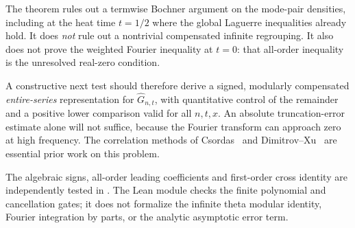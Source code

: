 The theorem rules out a termwise Bochner
argument on the mode-pair densities, including
at the heat time \(t=1/2\) where the global
Laguerre inequalities already hold. It does
\emph{not} rule out a nontrivial compensated
infinite regrouping. It also does not prove
the weighted Fourier inequality at \(t=0\):
that all-order inequality is the unresolved
real-zero condition.

A constructive next test should therefore
derive a signed, modularly compensated
\emph{entire-series} representation for
\(\widehat G_{n,t}\), with quantitative control
of the remainder and a positive lower
comparison valid for all \(n,t,x\).
An absolute truncation-error estimate alone
will not suffice, because the Fourier
transform can approach zero at high frequency.
The correlation methods of
Csordas~\cite{Cs,CsTrunc} and
Dimitrov--Xu~\cite{DX} are essential prior
work on this problem.

The algebraic signs, all-order leading
coefficients and first-order cross identity
are independently tested in
.
The Lean module
checks the finite polynomial and
cancellation gates; it does not
formalize the infinite theta modular
identity, Fourier integration by parts,
or the analytic asymptotic error term.
